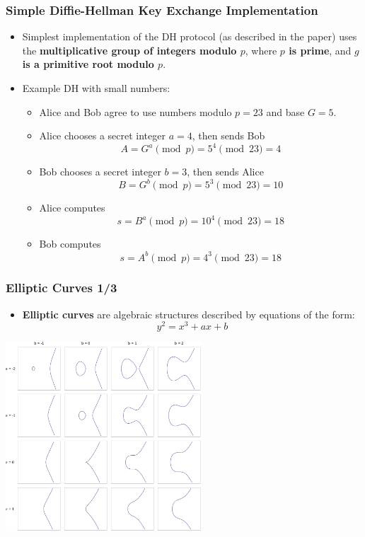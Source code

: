 \documentclass{beamer}
\begin{document}
\begin{frame}
  \frametitle{Simple Diffie-Hellman Key Exchange Implementation}
  \begin{itemize}
  \item Simplest implementation of the DH protocol (as described in the paper)
    uses the \textbf{multiplicative group of integers modulo $p$}, where
    \textbf{$p$ is prime}, and\textbf{ $g$ is a primitive root modulo $p$}.
  \item Example DH with small numbers:
    \begin{itemize}
      \scriptsize
    \item Alice and Bob agree to use numbers modulo $p = 23$ and base $G = 5$.
    \item Alice chooses a secret integer $a = 4$, then sends Bob
        $$A = G^a \pmod{p} = 5^4 \pmod{23} = 4$$
    \item Bob chooses a secret integer $b = 3$, then sends Alice
      $$B = G^b \pmod{p} = 5^3 \pmod{23} = 10$$
    \item Alice computes
      $$s = B^a \pmod{p} = 10^4 \pmod{23} = 18$$
    \item Bob computes
      $$s = A^b \pmod{p} = 4^3 \pmod{23} = 18$$
    \end{itemize}
  \end{itemize}
\end{frame}

\begin{frame}
  \frametitle{Elliptic Curves 1/3}
  \begin{itemize}
  \item \textbf{Elliptic curves} are algebraic structures described by equations
    of the form:
    $$y^2 = x^3 + ax + b$$
  \end{itemize}
  \begin{center}
    \includegraphics[width=0.55\textwidth]{ec}
  \end{center}
\end{frame}
\end{document}
